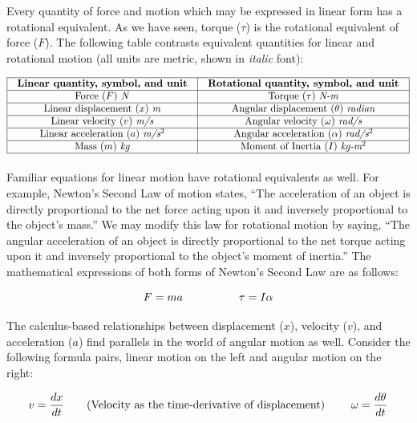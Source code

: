 \vskip 10pt

\filbreak

Every quantity of force and motion which may be expressed in linear form has a rotational equivalent.  As we have seen, torque ($\tau$) is the rotational equivalent of force ($F$).  The following table contrasts equivalent quantities for linear and rotational motion (all units are metric, shown in \textit{italic} font):


$$\vbox{\offinterlineskip
\halign{\strut
\vrule \quad\hfil # \ \hfil & 
\vrule \quad\hfil # \ \hfil \vrule \cr
\noalign{\hrule}
%
\textbf{Linear quantity, symbol, and unit} & \textbf{Rotational quantity, symbol, and unit} \cr
%
\noalign{\hrule}
%
Force ($F$) \textit{N} & Torque ($\tau$) \textit{N-m} \cr
%
\noalign{\hrule}
%
Linear displacement ($x$) \textit{m} & Angular displacement ($\theta$) \textit{radian} \cr
%
\noalign{\hrule}
%
Linear velocity ($v$) \textit{m/s} & Angular velocity ($\omega$) \textit{rad/s} \cr
%
\noalign{\hrule}
%
Linear acceleration ($a$) \textit{m/s$^{2}$} & Angular acceleration ($\alpha$) \textit{rad/s$^{2}$} \cr
%
\noalign{\hrule}
%
Mass ($m$) \textit{kg} & Moment of Inertia ($I$) \textit{kg-m$^{2}$} \cr
%
\noalign{\hrule}
} %
}$$ %

Familiar equations for linear motion have rotational equivalents as well.  For example, Newton's Second Law of motion states, ``The acceleration of an object is directly proportional to the net force acting upon it and inversely proportional to the object's mass.''  We may modify this law for rotational motion by saying, ``The angular acceleration of an object is directly proportional to the net torque acting upon it and inversely proportional to the object's moment of inertia.''  The mathematical expressions of both forms of Newton's Second Law are as follows:  

$$F = ma \hskip 50pt \tau = I \alpha$$

The calculus-based relationships between displacement ($x$), velocity ($v$), and acceleration ($a$) find parallels in the world of angular motion as well.  Consider the following formula pairs, linear motion on the left and angular motion on the right:

$$v = {dx \over dt} \hbox{\hskip 20pt (Velocity as the time-derivative of displacement) \hskip 20pt} \omega = {d \theta \over dt}$$

